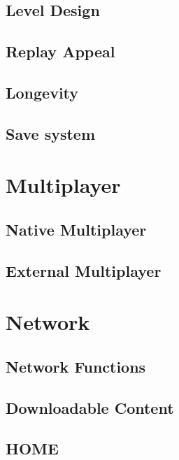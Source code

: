 \documentclass[12pt]{article}
\begin{document}
\subsection{Level Design}

\subsection{Replay Appeal} 

\subsection{Longevity}

\subsection{Save system}

\newpage

\section{Multiplayer}

\subsection{Native Multiplayer}

\subsection{External Multiplayer}

\newpage

\section{Network}

\subsection{Network Functions}     

\subsection{Downloadable Content}               

\subsection{HOME}
\end{document}
